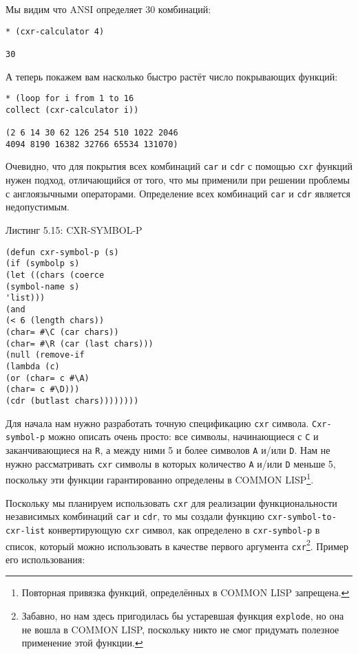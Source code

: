 Мы видим что ANSI определяет 30 комбинаций:

\begin{verbatim}
* (cxr-calculator 4)

30
\end{verbatim}

А теперь покажем вам насколько быстро растёт число покрывающих функций:

\begin{verbatim}
* (loop for i from 1 to 16
collect (cxr-calculator i))

(2 6 14 30 62 126 254 510 1022 2046
4094 8190 16382 32766 65534 131070)
\end{verbatim}

Очевидно, что для покрытия всех комбинаций \verb|car| и \verb|cdr| с помощью \verb|cxr| функций нужен подход, отличающийся от того, что мы применили при решении проблемы с англоязычными операторами. Определение всех комбинаций \verb|car| и \verb|cdr| является недопустимым.

Листинг 5.15: CXR-SYMBOL-P\label{listing_5.15}
\listbegin
\begin{verbatim}
(defun cxr-symbol-p (s)
(if (symbolp s)
(let ((chars (coerce
(symbol-name s)
'list)))
(and
(< 6 (length chars))
(char= #\C (car chars))
(char= #\R (car (last chars)))
(null (remove-if
(lambda (c)
(or (char= c #\A)
(char= c #\D)))
(cdr (butlast chars))))))))
\end{verbatim}
\listend

Для начала нам нужно разработать точную спецификацию \verb|cxr| символа. \verb|Cxr-symbol-p| можно описать очень просто: все символы, начинающиеся с \verb|C| и заканчивающиеся на \verb|R|, а между ними 5 и более символов \verb|A| и/или \verb|D|. Нам не нужно рассматривать \verb|cxr| символы в которых количество \verb|A| и/или \verb|D| меньше 5, поскольку эти функции гарантированно определены в COMMON LISP\footnote{Повторная привязка функций, определённых в COMMON LISP запрещена.}.



Поскольку мы планируем использовать \verb"cxr" для реализации функциональности независимых комбинаций \verb"car" и \verb"cdr", то мы создали функцию \verb"cxr-symbol-to-cxr-list" конвертирующую \verb"cxr" символ, как определено в \verb"cxr-symbol-p" в список, который можно использовать в качестве первого аргумента \verb"cxr"\footnote{Забавно, но нам здесь пригодилась бы устаревшая функция \verb"explode", но она не вошла в COMMON LISP, поскольку никто не смог придумать полезное применение этой функции.}. Пример его использования:



